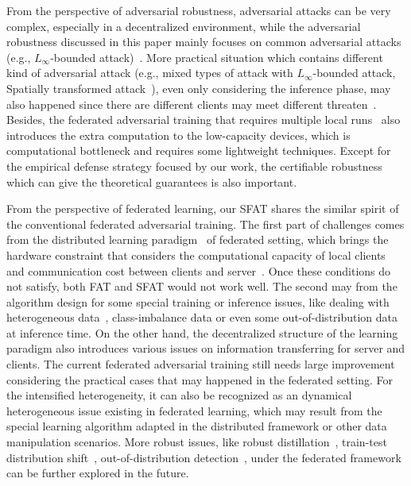 \documentclass{article} %
\theoremstyle{plain}
\theoremstyle{definition}
\theoremstyle{remark}
\begin{document}
From the perspective of adversarial robustness, adversarial attacks can be very complex, especially in a decentralized environment, while the adversarial robustness discussed in this paper mainly focuses on common adversarial attacks (e.g., $L_\infty$-bounded attack)~\citep{Goodfellow14_Adversarial_examples}. More practical situation which contains different kind of adversarial attack (e.g., mixed types of attack with $L_\infty$-bounded attack, Spatially transformed attack~\citep{xiao2018spatially}), even only considering the inference phase, may also happened since there are different clients may meet different threaten~\citep{kairouz2019advances,yao2022edge}. Besides, the federated adversarial training that requires multiple local runs~\citep{Madry_adversarial_training,Zhang_trades} also introduces the extra computation to the low-capacity devices, which is computational bottleneck and requires some lightweight techniques. Except for the empirical defense strategy focused by our work, the certifiable robustness~\citep{cohen2019certified,zizzo2021certified,alfarra2022certified} which can give the theoretical guarantees is also important.

From the perspective of federated learning, our SFAT shares the similar spirit of the conventional federated adversarial training. The first part of challenges comes from the distributed learning paradigm~\citep{mcmahan2017communication,kairouz2019advances,lit2020federated} of federated setting, which brings the hardware constraint that considers the computational capacity of local clients and communication cost between clients and server~\citep{hong2021federated}. Once these conditions do not satisfy, both FAT and SFAT would not work well. The second may from the algorithm design for some special training or inference issues, like dealing with heterogeneous data~\citep{li2018federated,zhao2018federated}, class-imbalance data or even some out-of-distribution data at inference time. On the other hand, the decentralized structure of the learning paradigm also introduces various issues on information transferring for server and clients.
The current federated adversarial training still needs large improvement considering the practical cases that may happened in the federated setting. For the intensified heterogeneity, it can also be recognized as an dynamical heterogeneous issue existing in federated learning, which may result from the special learning algorithm adapted in the distributed framework or other data manipulation scenarios. More robust issues, like robust distillation~\citep{goldblum2020adversarially,zhu2022reliable}, train-test distribution shift~\citep{jiang2023testtime}, out-of-distribution detection~\citep{yu2023turning}, under the federated framework can be further explored in the future.
\end{document}

